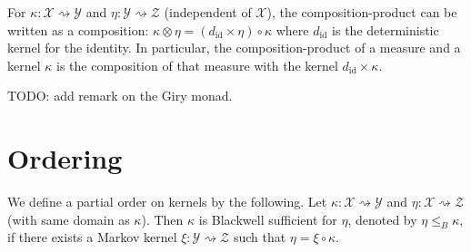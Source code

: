 For $\kappa : \mathcal X \rightsquigarrow \mathcal Y$ and $\eta : \mathcal Y \rightsquigarrow \mathcal Z$ (independent of $\mathcal X$), the composition-product can be written as a composition: $\kappa \otimes \eta = (d_{\text{id}} \times \eta) \circ \kappa$ where $d_{\text{id}}$ is the deterministic kernel for the identity.
In particular, the composition-product of a measure and a kernel $\kappa$ is the composition of that measure with the kernel $d_{\text{id}} \times \kappa$.

TODO: add remark on the Giry monad.

\section{Ordering}

\begin{definition}
  \label{def:blackwellOrder}
  We define a partial order on kernels by the following. Let $\kappa : \mathcal X \rightsquigarrow \mathcal Y$ and $\eta : \mathcal X \rightsquigarrow \mathcal Z$ (with same domain as $\kappa$).
  Then $\kappa$ is Blackwell sufficient for $\eta$, denoted by $\eta \le_B \kappa$, if there exists a Markov kernel $\xi : \mathcal Y \rightsquigarrow \mathcal Z$ such that $\eta = \xi \circ \kappa$.
\end{definition}